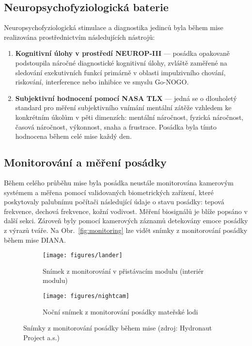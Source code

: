 \subsection{Neuropsychofyziologická baterie}
\label{subsubsec:neuro_testy}
Neuropsychofyziologická stimulace a diagnostika jedinců byla během mise
realizována prostřednictvím následujících nástrojů:
\begin{enumerate}
    \item \textbf{Kognitivní úlohy v prostředí NEUROP-III} --- posádka opakovaně
          podstoupila náročné diagnostické kognitivní úlohy, zvláště zaměřené na
          sledování exekutivních funkcí primárně v oblasti impulzivního chování,
          riskování, interference nebo inhibice ve smyslu Go-NOGO.
    \item \textbf{Subjektivní hodnocení pomocí NASA TLX} --- jedná se o
          dlouholetý standard pro měření subjektivního vnímání mentální zátěže
          vzhledem ke konkrétním úkolům v pěti dimenzích: mentální náročnost, fyzická
          náročnost, časová náročnost, výkonnost, snaha a frustrace. Posádka byla
          tímto hodnocena během celé mise každý den.
\end{enumerate}

\subsection{Monitorování a měření posádky}
\label{subsec:monitorovani posadky}
Během celého průběhu mise byla posádka neustále monitorována kamerovým systémem
a měřena pomocí validovaných biometrických zařízení, které poskytovaly palubnímu
počítači následující údaje o stavu posádky: tepová frekvence, dechová frekvence,
kožní vodivost. Měření biosignálů je blíže popsáno v další sekci. Zároveň byly
pomocí kamerových záznamů detekovány emoce posádky z výrazů tváře. Na
Obr.~\ref{fig:monitoring} lze vidět snímky z monitorování posádky během mise
DIANA.

\begin{figure}[h]
    \begin{subfigure}[h]{0.48\linewidth}
        \texttt{[image: figures/lander]}
        \caption{Snímek z monitorování v přistávacím modulu (interiér modulu)}
    \end{subfigure}
    \hfill
    \begin{subfigure}[h]{0.48\linewidth}
        \texttt{[image: figures/nightcam]}
        \caption{Noční snímek z monitorování posádky mateřské lodi}
    \end{subfigure}
    \caption{Snímky z monitorování posádky během mise (zdroj: Hydronaut Project a.s.)}
\end{figure}

